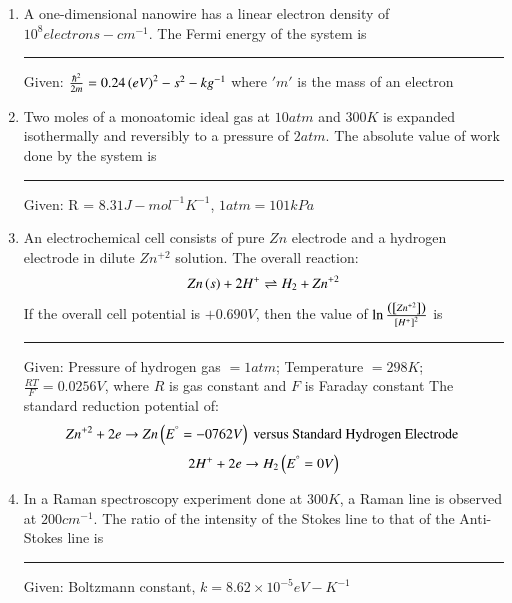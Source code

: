 \documentclass[journal]{IEEEtran}
\numberwithin{equation}{enumi}
\numberwithin{figure}{enumi}
\begin{document}
\begin{enumerate}
		\hfill{}

	\item A one-dimensional nanowire has a linear electron density of $10^8 electrons-cm^{-1}$. The Fermi energy of the system is \rule{1cm}{0.1pt} 

		Given: $\frac{\hbar^2}{2m} = 0.24\left(eV\right)^2-s^2-kg^{-1}$ where $'m'$ is the mass of an electron

		\hfill{}

	\item Two moles of a monoatomic ideal gas at $10 atm$ and $300 K$ is expanded isothermally and reversibly to a pressure of $2 atm$. The absolute value of work done by the system is  \rule{1cm}{0.1pt} 

		Given: R = $8.31J-mol^{-1}K^{-1}$, $1 atm = 101 kPa$

		\hfill{}

	\item An electrochemical cell consists of pure $Zn$ electrode  and a hydrogen electrode  in dilute $Zn^{+2}$ solution. The overall reaction: 
		\begin{align*}
			Zn\left(s\right) + 2H^{+} \rightleftharpoons H_2 + Zn^{+2}
		\end{align*}
		If the overall cell potential is $+0.690 V$, then the value of $\ln{\frac{\ensuremath{\left({}\left[Zn^{+2}\right]\right)}}{\ensuremath{{}\left[H^{+}\right]}^2}}$ is \rule{1cm}{0.1pt} 
		Given: Pressure of hydrogen gas $= 1 atm$; Temperature $= 298K$;
		$\frac{RT}{F} = 0.0256 V$, where $R$ is gas constant and $F$ is Faraday constant
		The standard reduction potential of: 
		\begin{align*}
			Zn^{+2} + 2e \rightarrow Zn \left(E^{\degree} = -0762 V\right) \text{ versus Standard Hydrogen Electrode }
		\end{align*}
		\begin{align*}
			2H^{+} + 2e \rightarrow H_2 \left(E^{\degree} = 0 V\right)
		\end{align*}

		\hfill{}

	\item In a Raman spectroscopy experiment done at $300K$, a Raman line is observed at $200cm^{-1}$. The ratio of the intensity of the Stokes line to that of the Anti-Stokes line is \rule{1cm}{0.1pt} 

		Given: Boltzmann constant, $k = 8.62 \times 10^{-5} eV-K^{-1}$
		\hfill{}
\end{enumerate}
\end{document}
